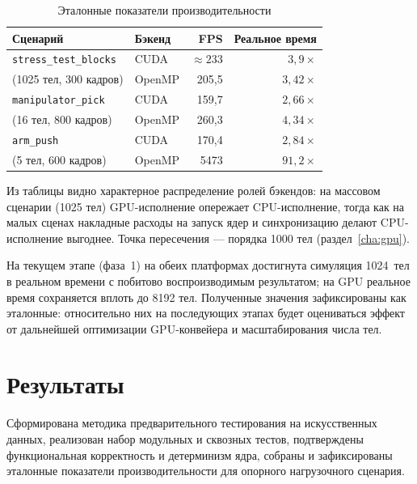 \begin{table}[ht]
  \centering
  \caption{Эталонные показатели производительности}
  \label{tab:bench}
  \small
  \begin{tabular}{p{} l r r}
    \toprule
    Сценарий & Бэкенд & FPS & Реальное время \\
    \midrule
    \texttt{stress\_test\_blocks} & CUDA   & ${\approx}233$ & $3{,}9\times$ \\
    (1025 тел, 300 кадров)        & OpenMP & 205{,}5 & $3{,}42\times$ \\
    \midrule
    \texttt{manipulator\_pick}    & CUDA   & 159{,}7 & $2{,}66\times$ \\
    (16 тел, 800 кадров)          & OpenMP & 260{,}3 & $4{,}34\times$ \\
    \midrule
    \texttt{arm\_push}            & CUDA   & 170{,}4 & $2{,}84\times$ \\
    (5 тел, 600 кадров)           & OpenMP & 5473 & $91{,}2\times$ \\
    \bottomrule
  \end{tabular}
\end{table}

Из таблицы видно характерное распределение ролей бэкендов: на массовом
сценарии (1025 тел) GPU-исполнение опережает CPU-исполнение, тогда как на
малых сценах накладные расходы на запуск ядер и синхронизацию делают
CPU-исполнение выгоднее. Точка пересечения --- порядка 1000 тел
(раздел~\ref{cha:gpu}).


На текущем этапе (фаза~1) на обеих платформах достигнута симуляция 1024~тел в
реальном времени с побитово воспроизводимым результатом; на GPU реальное время
сохраняется вплоть до 8192 тел. Полученные значения зафиксированы как
эталонные: относительно них на последующих этапах будет оцениваться эффект от
дальнейшей оптимизации GPU-конвейера и масштабирования числа тел.

\section{Результаты}

Сформирована методика предварительного тестирования на искусственных данных,
реализован набор модульных и сквозных тестов, подтверждены функциональная
корректность и детерминизм ядра, собраны и зафиксированы эталонные показатели
производительности для опорного нагрузочного сценария.
